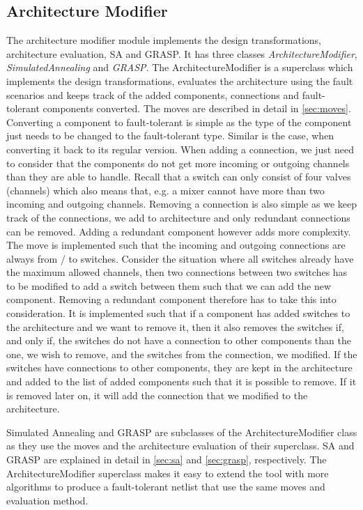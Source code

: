 \subsection{Architecture Modifier}
The architecture modifier module implements the design transformations, architecture evaluation, SA and GRASP. It has three classes \emph{ArchitectureModifier}, \emph{SimulatedAnnealing} and \emph{GRASP}. The ArchitectureModifier is a superclass which implements the design transformations, evaluates the architecture using the fault scenarios and keeps track of the added components, connections and fault-tolerant components converted. The moves are described in detail in \autoref{sec:moves}. Converting a component to fault-tolerant is simple as the type of the component just needs to be changed to the fault-tolerant type. Similar is the case, when converting it back to its regular version. When adding a connection, we just need to consider that the components do not get more incoming or outgoing channels than they are able to handle. Recall that a switch can only consist of four valves (channels) which also means that, e.g. a mixer cannot have more than two incoming and outgoing channels. Removing a connection is also simple as we keep track of the connections, we add to architecture and only redundant connections can be removed. Adding a redundant component however adds more complexity. The move is implemented such that the incoming and outgoing connections are always from / to switches. Consider the situation where all switches already have the maximum allowed channels, then two connections between two switches has to be modified to add a switch between them such that we can add the new component. Removing a redundant component therefore has to take this into consideration. It is implemented such that if a component has added switches to the architecture and we want to remove it, then it also removes the switches if, and only if, the switches do not have a connection to other components than the one, we wish to remove, and the switches from the connection, we modified. If the switches have connections to other components, they are kept in the architecture and added to the list of added components such that it is possible to remove. If it is removed later on, it will add the connection that we modified to the architecture.

Simulated Annealing and GRASP are subclasses of the ArchitectureModifier class as they use the moves and the architecture evaluation of their superclass. SA and GRASP are explained in detail in \autoref{sec:sa} and \autoref{sec:grasp}, respectively. The ArchitectureModifier superclass makes it easy to extend the tool with more algorithms to produce a fault-tolerant netlist that use the same moves and evaluation method.

